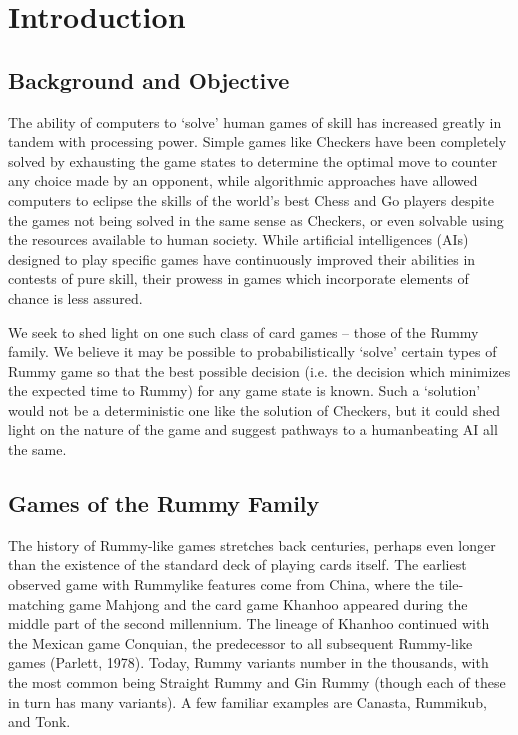 \documentclass[paper=a4, fontsize=11pt,twoside]{report}   %
\begin{document}
\chapter{Introduction}

\section{Background and Objective}
\doublespacing
The ability of computers to ‘solve’ human games of skill has increased greatly in tandem with processing power. Simple games like Checkers have been completely solved by exhausting the game states to determine the optimal move to counter any choice made by an opponent, while algorithmic approaches have allowed computers to eclipse the skills of the world’s best Chess and Go players despite the games not being solved in the same sense as Checkers, or even solvable using the resources available to human society. While artificial intelligences (AIs) designed to play specific games have continuously improved their abilities in contests of pure skill, their prowess in games which incorporate elements of chance is less assured.
 
We seek to shed light on one such class of card games – those of the Rummy family. We believe it may be possible to probabilistically ‘solve’ certain types of Rummy game so that the best possible decision (i.e. the decision which minimizes the expected time to Rummy) for any game state is known. Such a ‘solution’ would not be a deterministic one like the solution of Checkers, but it could shed light on the nature of the game and suggest pathways to a humanbeating AI all the same. 
 
\section{Games of the Rummy Family}

The history of Rummy-like games stretches back centuries, perhaps even longer than the existence of the standard deck of playing cards itself. The earliest observed game with Rummylike features come from China, where the tile-matching game Mahjong and the card game Khanhoo appeared during the middle part of the second millennium. The lineage of Khanhoo  continued with the Mexican game Conquian, the predecessor to all subsequent Rummy-like games (Parlett, 1978). Today, Rummy variants number in the thousands, with the most common being Straight Rummy and Gin Rummy (though each of these in turn has many variants). A few familiar examples are Canasta, Rummikub, and Tonk. \\
\end{document}
